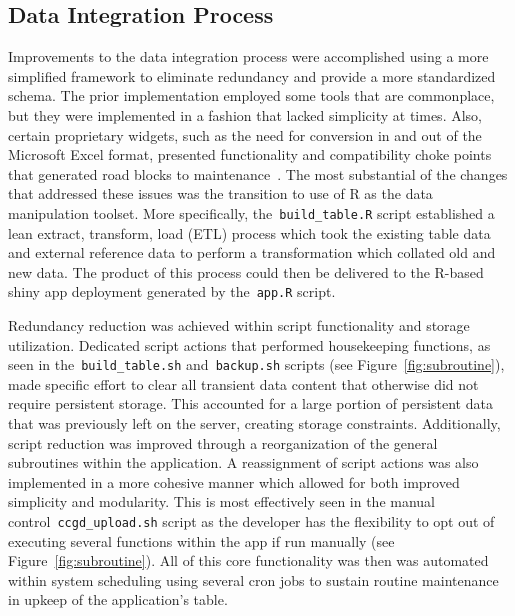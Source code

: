 \documentclass[10pt]{report}
\begin{document}
\subsection{Data Integration Process}
Improvements to the data integration process were accomplished using a more simplified framework to eliminate redundancy and provide a more standardized schema. The prior implementation employed some tools that are commonplace, but they were implemented in a fashion that lacked simplicity at times. Also, certain proprietary widgets, such as the need for conversion in and out of the Microsoft Excel format, presented functionality and compatibility choke points that generated road blocks to maintenance~\cite{abbottCandidateCancerGene2015a}. The most substantial of the changes that addressed these issues was the transition to use of R as the data manipulation toolset. More specifically, the~\texttt{build\_table.R} script established a lean extract, transform, load (ETL) process which took the existing table data and external reference data to perform a transformation which collated old and new data. The product of this process could then be delivered to the R-based shiny app deployment generated by the~\texttt{app.R} script.

Redundancy reduction was achieved within script functionality and storage utilization. Dedicated script actions that performed housekeeping functions, as seen in the~\texttt{build\_table.sh} and~\texttt{backup.sh} scripts (see Figure~\ref{fig:subroutine}), made specific effort to clear all transient data content that otherwise did not require persistent storage. This accounted for a large portion of persistent data that was previously left on the server, creating storage constraints. Additionally, script reduction was improved through a reorganization of the general subroutines within the application. A reassignment of script actions was also implemented in a more cohesive manner which allowed for both improved simplicity and modularity. This is most effectively seen in the manual control~\texttt{ccgd\_upload.sh} script as the developer has the flexibility to opt out of executing several functions within the app if run manually (see Figure~\ref{fig:subroutine}). All of this core functionality was then was automated within system scheduling using several cron jobs to sustain routine maintenance in upkeep of the application's table.
\end{document}
